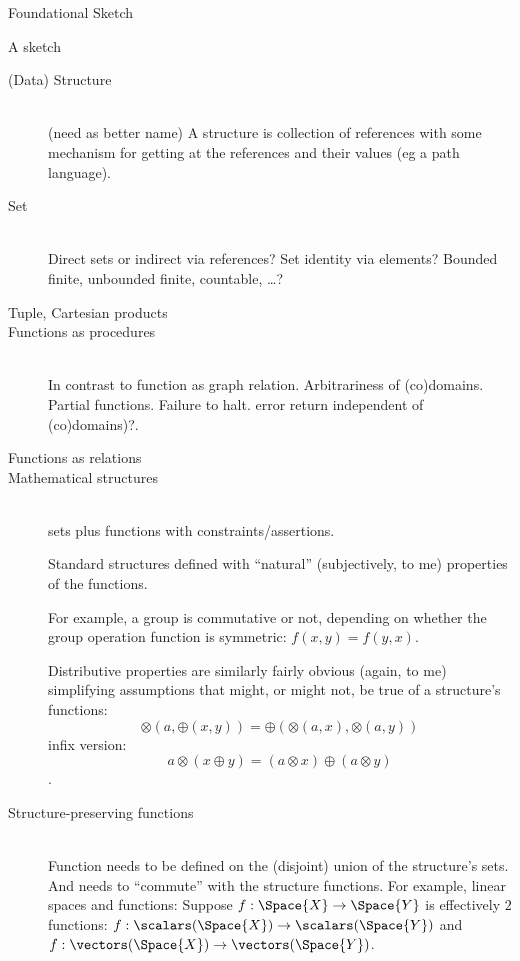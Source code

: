 \begin{plSection}{Foundational Sketch}
\begin{plSection}{A sketch}
\begin{description}
\item[(Data) Structure]\mbox{}\\
(need as better name)
A structure is collection of references with
some mechanism for getting at the references and their values
(eg a path language).

\item[Set]  \mbox{}\\
Direct sets or indirect via references?
Set identity via elements?
Bounded finite, unbounded finite, countable, \ldots ?

\item[Tuple, Cartesian products]%

\item[Functions as procedures]\mbox{}\\
In contrast to function as graph relation.
Arbitrariness of (co)domains. Partial functions. Failure to halt.
error return independent of (co)domains)?.

\item[Functions as relations]%

\item[Mathematical structures]\mbox{}\\
sets plus functions with constraints/assertions.
\par
Standard structures defined with ``natural'' (subjectively, to me)
properties of the functions. 
\par
For example, a group is commutative or not, depending on whether
the group operation function is symmetric: $f(x,y) = f(y,x)$.
\par
Distributive properties are similarly fairly obvious
(again, to me)
simplifying assumptions that might, or might not, be true of
a structure's functions: 
\[
\otimes (a,\oplus (x,y)) = \oplus (\otimes (a,x), \otimes (a,y))
\]
infix version: 
\[
a \otimes (x \oplus y) = (a \otimes x) \oplus (a \otimes y)
\].

\item[Structure-preserving functions]\mbox{}\\
Function needs to be defined on the (disjoint) union of the 
structure's sets.
And needs to ``commute'' with the structure functions.
For example, linear spaces and functions: 
Suppose $f : \Space{X} \rightarrow \Space{Y}$
is effectively $2$ functions:
$f : \scalars(\Space{X}) \rightarrow \scalars(\Space{Y})$ and
$f : \vectors(\Space{X}) \rightarrow \vectors(\Space{Y})$.
 

\end{description}
\end{plSection}
\end{plSection}
